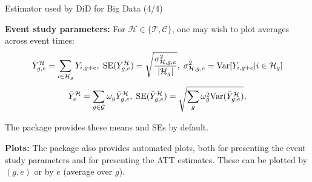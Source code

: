 \documentclass[usenames,dvipsnames]{beamer}
\begin{document}
\begin{frame}{Estimator used by DiD for Big Data (4/4)}

 
\textbf{Event study parameters:} For $\mathcal{H} \in \{ \mathcal{T} , \mathcal{C} \}$, one may wish to plot averages across event times:
\begin{equation} \notag
\bar{Y}^\mathcal{H}_{g,e} = \sum_{i \in \mathcal{H}_g}Y_{i,g+e} , \;
\text{SE}(\bar{Y}^\mathcal{H}_{g,e}) = \sqrt{\frac{\sigma^2_{\mathcal{H},g,e}}{|\mathcal{H}_g|}},  \; \sigma^2_{\mathcal{H},g,e} = \text{Var}[Y_{i,g+e} | i \in \mathcal{H}_g]
\end{equation} 
\begin{equation} \notag
\bar{Y}^\mathcal{H}_{e} = \sum_{g \in \mathcal{G}}
\omega_g \bar{Y}^\mathcal{H}_{g,e}
 , \;
\text{SE}(\bar{Y}^\mathcal{H}_{g,e}) = \sqrt{\sum_g \omega_g^2 \text{Var}(\bar{Y}^\mathcal{H}_{g,e})},
\end{equation} 

The package provides these means and SEs by default.

\vspace{0.5cm}

\textbf{Plots:} The package also provides automated plots, both for presenting the event study parameters and for presenting the ATT estimates. These can be plotted by $(g,e)$ or by $e$ (average over $g$).

\end{frame}
\end{document}
